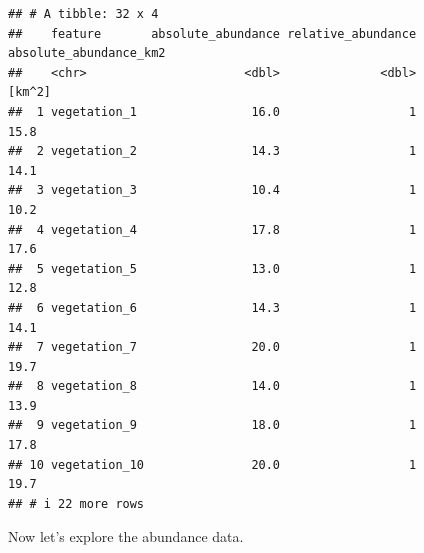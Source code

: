\documentclass[12pt,]{book}
\newenvironment{Shaded}{\begin{snugshade}}{\end{snugshade}}
\newcommand{\CommentTok}[1]{\textcolor[rgb]{0.56,0.35,0.01}{\textit{#1}}}
\newcommand{\DecValTok}[1]{\textcolor[rgb]{0.00,0.00,0.81}{#1}}
\newcommand{\KeywordTok}[1]{\textcolor[rgb]{0.13,0.29,0.53}{\textbf{#1}}}
\newcommand{\NormalTok}[1]{#1}
\newcommand{\OperatorTok}[1]{\textcolor[rgb]{0.81,0.36,0.00}{\textbf{#1}}}
\newcommand{\StringTok}[1]{\textcolor[rgb]{0.31,0.60,0.02}{#1}}
\begin{document}
\begin{Shaded}
\end{Shaded}

\begin{verbatim}
## # A tibble: 32 x 4
##    feature       absolute_abundance relative_abundance absolute_abundance_km2
##    <chr>                      <dbl>              <dbl>                 [km^2]
##  1 vegetation_1                16.0                  1                   15.8
##  2 vegetation_2                14.3                  1                   14.1
##  3 vegetation_3                10.4                  1                   10.2
##  4 vegetation_4                17.8                  1                   17.6
##  5 vegetation_5                13.0                  1                   12.8
##  6 vegetation_6                14.3                  1                   14.1
##  7 vegetation_7                20.0                  1                   19.7
##  8 vegetation_8                14.0                  1                   13.9
##  9 vegetation_9                18.0                  1                   17.8
## 10 vegetation_10               20.0                  1                   19.7
## # i 22 more rows
\end{verbatim}

Now let's explore the abundance data.

\begin{Shaded}
\end{Shaded}
\end{document}
